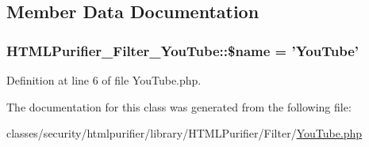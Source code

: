 \subsection{Member Data Documentation}
\hypertarget{classHTMLPurifier__Filter__YouTube_a558fc2c5f2a44bc705f0a6179d8cf160}{
\subsubsection[{\$name}]{\setlength{\rightskip}{0pt plus 5cm}H\+T\+M\+L\+Purifier\+\_\+\+Filter\+\_\+\+You\+Tube\+::\$name = 'You\+Tube'}}\label{classHTMLPurifier__Filter__YouTube_a558fc2c5f2a44bc705f0a6179d8cf160}


Definition at line 6 of file You\+Tube.\+php.



The documentation for this class was generated from the following file\+:\begin{DoxyCompactItemize}
\item 
classes/security/htmlpurifier/library/\+H\+T\+M\+L\+Purifier/\+Filter/\hyperlink{YouTube_8php}{You\+Tube.\+php}\end{DoxyCompactItemize}

